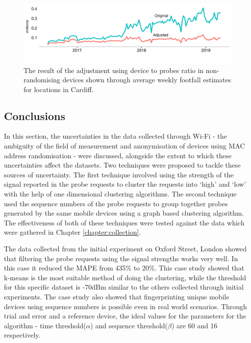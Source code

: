 \begin{figure}
  \includegraphics{images/processing-sss-final.png}
  \caption{The result of the adjustment using device to probes ratio in non-randomising devices shown through average weekly footfall estimates for locations in Cardiff.}
  \label{figure:processing:sss:final}
\end{figure}

\subsection{Conclusions}

In this section, the uncertainties in the data collected through Wi-Fi - the ambiguity of the field of measurement and anonymisation of devices using MAC address randomisation - were discussed, alongside the extent to which these uncertainties affect the datasets.
Two techniques were proposed to tackle these sources of uncertainty.
The first technique involved using the strength of the signal reported in the probe requests to cluster the requests into ‘high’ and ‘low’ with the help of one dimensional clustering algorithms.
The second technique used the sequence numbers of the probe requests to group together probes generated by the same mobile devices using a graph based clustering algorithm.
The effectiveness of both of these techniques were tested against the data which were gathered in  Chapter \ref{chapter:collection}.

The data collected from the initial experiment on Oxford Street, London showed that filtering the probe requests using the signal strengths works very well.
In this case it reduced the MAPE from 435\% to 20\%.
This case study showed that k-means is the most suitable method of doing the clustering, while the threshold for this specific dataset is -70dBm similar to the others collected through initial experiments.
The case study also showed that fingerprinting unique mobile devices using sequence numbers is possible even in real world scenarios.
Through trial and error and a reference device, the ideal values for the parameters for the algorithm - time threshold($\alpha$) and sequence threshold($\beta$) are 60 and 16 respectively.

